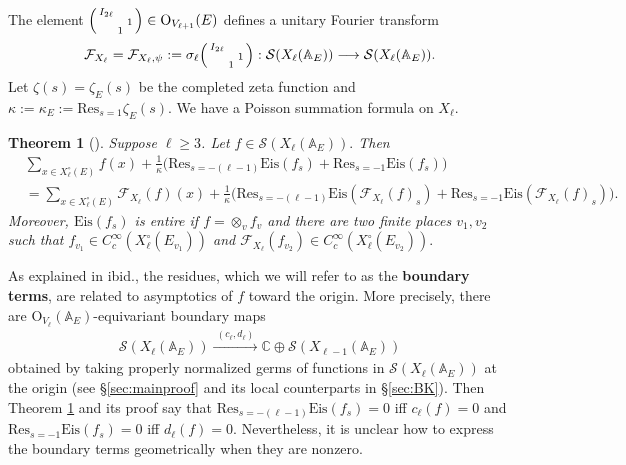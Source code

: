 \documentclass[11pt,a4paper,reqno]{amsart}
\newtheorem{thm}{Theorem}[section]
\theoremstyle{remark}
\numberwithin{equation}{section}
\newcommand{\A}{\mathbb{A}}
\newcommand{\CC}{\mathbb{C}}
\theoremstyle{definition}
\numberwithin{equation}{section}
\newenvironment{psmatrix}
  {\left(\begin{smallmatrix}}
  {\end{smallmatrix}\right)}
\begin{document}
 The element $\begin{psmatrix}
     I_{2\ell} & &\\
     & & 1\\
     & 1 &
 \end{psmatrix}\in \mathrm{O}_{V_{\ell+1}}(E)$ defines a unitary Fourier transform
\begin{align*}
    \mathcal{F}_{X_\ell}=\mathcal{F}_{X_\ell,\psi}:=\sigma_\ell\begin{psmatrix}
     I_{2\ell} & &\\
     & & 1\\
     & 1 &
 \end{psmatrix}:\mathcal{S}(X_\ell(\A_E))\longrightarrow \mathcal{S}(X_\ell(\A_E)).
\end{align*}
 Let $\zeta(s)=\zeta_E(s)$ be the completed zeta function and  $\kappa:=\kappa_E:=\mathrm{Res}_{s=1}\zeta_E(s)$. We have a Poisson summation formula on $X_\ell$.

\begin{thm}[{\cite[Theorem 1.6]{Hsu:asymptotics}}]\label{thm:Eis}
    Suppose $\ell\ge 3$. Let $f\in \mathcal{S}(X_\ell(\A_E)).$ Then
    \begin{align*}
        &\sum_{x\in X_\ell^\circ(E)} f(x)+\frac{1}{\kappa}\bigg(\mathrm{Res}_{s=-(\ell-1)} \mathrm{Eis}(f_{s})+\mathrm{Res}_{s=-1} \mathrm{Eis}(f_{s})\bigg)\\
        &=\sum_{x\in X_\ell^\circ(E)} \mathcal{F}_{X_\ell}(f)(x)+\frac{1}{\kappa}\bigg(\mathrm{Res}_{s=-(\ell-1)} \mathrm{Eis}(\mathcal{F}_{X_\ell}(f)_{s})+\mathrm{Res}_{s=-1} \mathrm{Eis}(\mathcal{F}_{X_\ell}(f)_{s})\bigg).
    \end{align*}
 Moreover, $\mathrm{Eis}(f_{s})$ is entire if $f=\otimes_v f_v$ and there are two finite places $v_1,v_2$ such that  $f_{v_1}\in C^\infty_c(X_\ell^\circ(E_{v_1}))$ and $\mathcal{F}_{X_\ell}(f_{v_2})\in C^\infty_c(X_\ell^\circ(E_{v_2})).$
\end{thm}

As explained in ibid., the residues, which we will refer to as the \textbf{boundary terms}, are related to asymptotics of $f$ toward the origin. More precisely, there are $\mathrm{O}_{V_{\ell}}(\A_E)$-equivariant boundary maps 
\begin{align*}
    \mathcal{S}(X_\ell(\A_E))\xrightarrow{\,\,(c_\ell,d_\ell)\,\,} \CC\oplus\mathcal{S}(X_{\ell-1}(\A_E)) 
\end{align*}
obtained by taking properly normalized germs of functions in $\mathcal{S}(X_\ell(\A_E))$ at the origin (see \S \ref{sec:mainproof} and its local counterparts in \S \ref{sec:BK}). Then Theorem \ref{thm:Eis} and its proof say that $\mathrm{Res}_{s=-(\ell-1)} \mathrm{Eis}(f_{s})=0$ iff $c_\ell(f)=0$ and $\mathrm{Res}_{s=-1} \mathrm{Eis}(f_{s})=0$  iff $d_\ell(f)=0.$ Nevertheless, it is unclear how to express the boundary terms geometrically when they are nonzero. 
\end{document}
